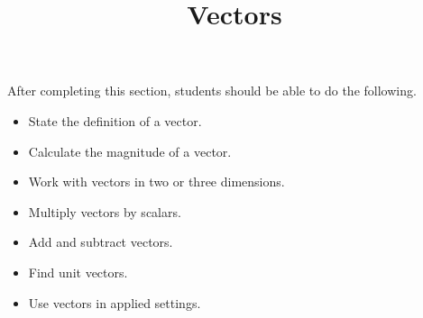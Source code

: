 \documentclass{ximera}
\title{Vectors}
\begin{document}
\begin{abstract}
\end{abstract}

\maketitle

\begin{sectionOutcomes}

After completing this section, students should be able to do the following.

\begin{itemize}
\item State the definition of a vector.
\item Calculate the magnitude of a vector.
\item Work with vectors in two or three dimensions.
\item Multiply vectors by scalars. 
\item Add and subtract vectors.
\item Find unit vectors.
\item Use vectors in applied settings.
\end{itemize}

\end{sectionOutcomes}
\end{document}
